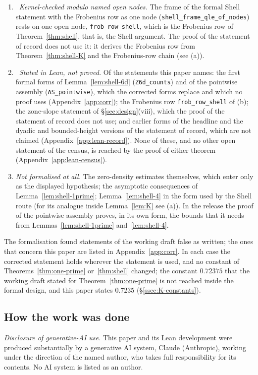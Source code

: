 \begin{enumerate}[label=(\alph*)]
hypothesis to the first formal form of an internal statement (Appendix~\ref{app:corr}); the first forms are kept in the library, open and unused.
\item \tagLm\ \emph{Kernel-checked modulo named open nodes.} The frame of the formal Shell statement with the Frobenius row as one node
(\texttt{shell\_frame\_qle\_of\_nodes}) rests on one open node, \texttt{frob\_row\_shell}, which is the Frobenius row of
Theorem~\ref{thm:shell}, that is, the Shell argument. The proof of the statement of record does not use it: it derives the Frobenius row from
Theorem~\ref{thm:shell-K} and the Frobenius-row chain (see (a)).
\item \tagLs\ \emph{Stated in Lean, not proved.} Of the statements this paper names: the first formal forms of Lemma~\ref{lem:shell-6d}
(\texttt{Z6d\_counts}) and of the pointwise assembly (\texttt{AS\_pointwise}), which the corrected forms replace and which no proof uses
(Appendix~\ref{app:corr}); the Frobenius row \texttt{frob\_row\_shell} of (b); the zone-slope statement of \S\ref{sec:design}(viii), which the proof
of the statement of record does not use; and earlier forms of the headline and the dyadic and bounded-height versions of the statement of record,
which are not claimed (Appendix~\ref{app:lean-record}). None of these, and no other open statement of the census, is reached by the proof of either
theorem (Appendix~\ref{app:lean-census}).
\item \emph{Not formalised at all.} The zero-density estimates themselves, which enter only as the displayed hypothesis; the asymptotic consequences of
Lemma~\ref{lem:shell-1prime}; Lemma~\ref{lem:shell-4} in the form used by the Shell route (for its analogue inside Lemma~\ref{lem:K} see (a)). In the
release the proof of the pointwise assembly proves, in its own form, the bounds that it needs from Lemmas~\ref{lem:shell-1prime} and~\ref{lem:shell-4}.
\end{enumerate}
The formalisation found statements of the working draft false as written; the ones that concern this paper are listed in Appendix~\ref{app:corr}. In
each case the corrected statement holds wherever the statement is used, and no constant of Theorems~\ref{thm:one-prime} or~\ref{thm:shell} changed; the
constant $0.72375$ that the working draft stated for Theorem~\ref{thm:one-prime} is not reached inside the formal design, and this paper states $0.7235$
(\S\ref{ssec:K-constants}).

\subsection{How the work was done}\label{ssec:how}
\emph{Disclosure of generative-AI use.} This paper and its Lean development were produced substantially by a generative AI system, Claude
(Anthropic), working under the direction of the named author, who takes full responsibility for its contents. No AI system is listed as an author.

